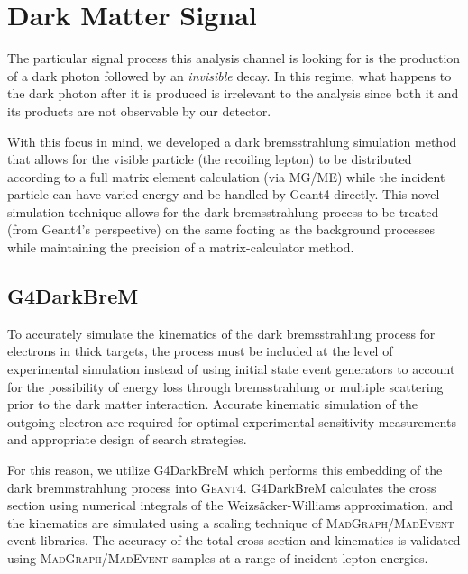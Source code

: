 \section{Dark Matter Signal}
The particular signal process this analysis channel is looking for is the production of a dark
photon followed by an \emph{invisible} decay. In this regime, what happens to the dark photon after
it is produced is irrelevant to the analysis since both it and its products are not observable by
our detector.

With this focus in mind, we developed a dark bremsstrahlung simulation method that allows for the
visible particle (the recoiling lepton) to be distributed according to a full matrix element
calculation (via MG/ME) while the incident particle can have varied energy and be handled by Geant4
directly. This novel simulation technique allows for the dark bremsstrahlung process to be treated
(from Geant4's perspective) on the same footing as the background processes while maintaining the
precision of a matrix-calculator method.

\subsection{G4DarkBreM}
To accurately simulate the kinematics of the dark bremsstrahlung process for electrons in thick
targets, the process must be included at the level of experimental simulation instead of using
initial state event generators to account for the possibility of energy loss through bremsstrahlung
or multiple scattering prior to the dark matter interaction. Accurate kinematic simulation of the
outgoing electron are required for optimal experimental sensitivity measurements and appropriate
design of search strategies.

For this reason, we utilize G4DarkBreM \cite{g4darkbrem} which performs this embedding of the dark
bremmstrahlung process into \textsc{Geant}4. G4DarkBreM calculates the cross section using
numerical integrals of the Weizs\"{a}cker-Williams approximation, and the kinematics are simulated
using a scaling technique of \textsc{MadGraph/MadEvent} event libraries. The accuracy of the total
cross section and kinematics is validated using \textsc{MadGraph/MadEvent} samples at a range of
incident lepton energies.

